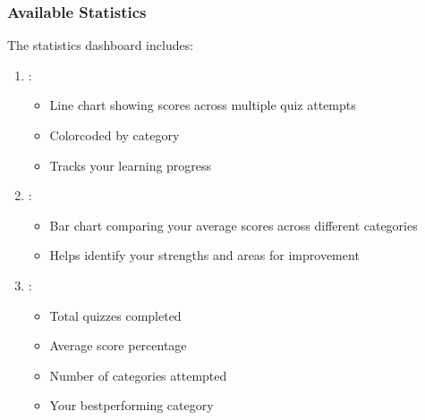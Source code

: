 \documentclass[letterpaper,10pt,english]{sphinxmanual}
\begin{document}
\subsubsection{Available Statistics}
\label{\detokenize{user_guide:available-statistics}}
\sphinxAtStartPar
The statistics dashboard includes:
\begin{enumerate}
%
\item {} 
\sphinxAtStartPar
{}:
\begin{itemize}
\item {} 
\sphinxAtStartPar
Line chart showing scores across multiple quiz attempts

\item {} 
\sphinxAtStartPar
Color\sphinxhyphen{}coded by category

\item {} 
\sphinxAtStartPar
Tracks your learning progress

\end{itemize}

\item {} 
\sphinxAtStartPar
{}:
\begin{itemize}
\item {} 
\sphinxAtStartPar
Bar chart comparing your average scores across different categories

\item {} 
\sphinxAtStartPar
Helps identify your strengths and areas for improvement

\end{itemize}

\item {} 
\sphinxAtStartPar
{}:
\begin{itemize}
\item {} 
\sphinxAtStartPar
Total quizzes completed

\item {} 
\sphinxAtStartPar
Average score percentage

\item {} 
\sphinxAtStartPar
Number of categories attempted

\item {} 
\sphinxAtStartPar
Your best\sphinxhyphen{}performing category

\end{itemize}

\end{enumerate}
\end{document}
